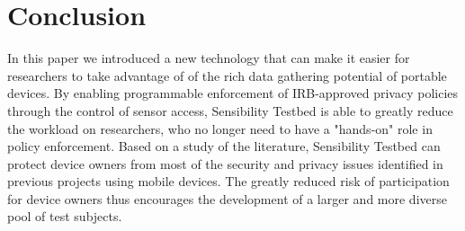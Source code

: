\section{Conclusion}\label{sec-conclude}

In this paper we introduced a new technology that can make it easier for 
researchers to take advantage of of the rich data gathering potential of 
portable devices. By enabling programmable enforcement of IRB-approved privacy 
policies through the control of sensor access, Sensibility Testbed is able to greatly 
reduce the workload on researchers, who no longer need to have a "hands-on"
role in policy enforcement. Based on a study of the literature, Sensibility Testbed
can protect device owners from most of the security and privacy issues identified
in previous projects using mobile devices. The greatly reduced risk of participation
for device owners thus encourages the development of a larger and more diverse pool 
of test subjects. 


 

